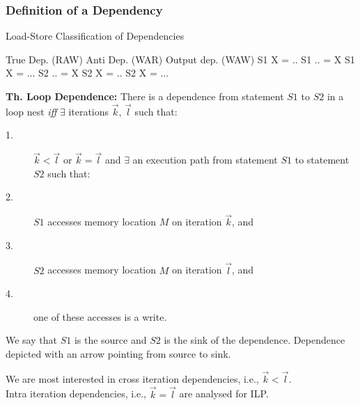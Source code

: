 \documentclass[rgb,dvipsnames]{beamer}
\newcommand{\emp}[1]{\textcolor{DikuRed}{ #1}}
\begin{document}
\begin{frame}[fragile,t]
  \frametitle{Definition of a Dependency} %

\begin{block}{Load-Store Classification of Dependencies}
\begin{colorcode}
True Dep. (RAW)      Anti Dep. (WAR)      Output dep. (WAW)
S1    X  = ..        S1    .. = X         S1    X = ...            
S2    .. = X         S2    X  = ..        S2    X = ...
\end{colorcode}
\end{block} 

\smallskip

{\bf Th. Loop Dependence:} There is a dependence from statement $S1$ to $S2$
in a loop nest {\em iff} $\exists$ iterations $\vec{k}$, $\vec{l}$ such that:\pause
\begin{description}
    \item[1.] $\vec{k} < \vec{l}$ or $\vec{k} = \vec{l}$ and $\exists$ 
                an execution path from statement $S1$ to statement $S2$ \emp{such that:}
    \item[2.] $S1$ accesses memory location $M$ on iteration $\vec{k}$, and
    \item[3.] $S2$ accesses memory location $M$ on iteration $\vec{l}$, and
    \item[4.] one of these accesses is a write.
\end{description}
\medskip

\emp{We say that $S1$ is the source and $S2$ is the sink of the dependence}. 
Dependence depicted with an arrow pointing from source to sink.\pause

\bigskip
We are most interested in cross iteration dependencies, i.e., $\vec{k} < \vec{l}$.\\\smallskip
Intra iteration dependencies, i.e., $\vec{k} = \vec{l}$ are analysed for ILP. 

\end{frame}
\end{document}
